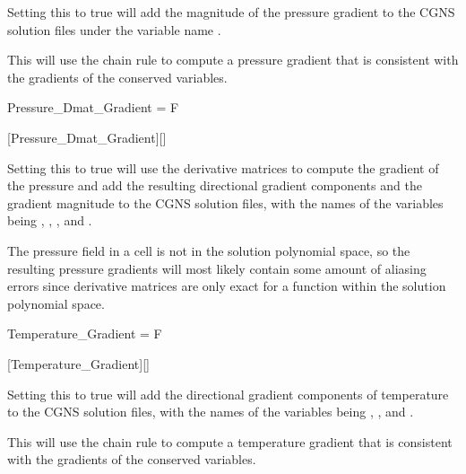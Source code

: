 \begin{nmldescbody}
Setting this to true will add the magnitude of the pressure gradient
to the CGNS solution files under the variable name .

\noindent\NOTE
This will use the chain rule to compute a pressure gradient that is consistent
with the gradients of the conserved variables.
\end{nmldescbody}


\begin{nmldescitem}
Pressure_Dmat_Gradient = F
\end{nmldescitem}
[Pressure\_Dmat\_Gradient][]

\begin{nmldescbody}
Setting this to true will use the derivative matrices to compute the gradient
of the pressure and add the resulting directional gradient components and the
gradient magnitude to the CGNS solution files, with the names of the variables
being , , , and
.

\noindent\NOTE
The pressure field in a cell is not in the solution polynomial space, so the
resulting pressure gradients will most likely contain some amount of aliasing
errors since derivative matrices are only exact for a function within the
solution polynomial space.
\end{nmldescbody}


\begin{nmldescitem}
Temperature_Gradient = F
\end{nmldescitem}
[Temperature\_Gradient][]

\begin{nmldescbody}
Setting this to true will add the directional gradient components of temperature
to the CGNS solution files, with the names of the variables being
, , and .

\noindent\NOTE
This will use the chain rule to compute a temperature gradient that is consistent
with the gradients of the conserved variables.
\end{nmldescbody}

